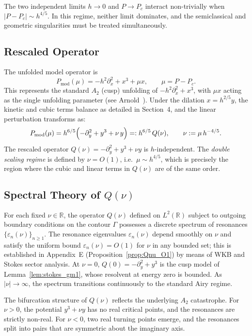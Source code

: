 \documentclass[12pt,a4paper]{amsart}
\theoremstyle{remark}
\begin{document}
The two independent limits $h \to 0$ and $P \to P_c$ interact non-trivially when
$|P - P_c| \sim h^{4/5}$. In this regime, neither limit dominates,
and the semiclassical and geometric singularities must be treated simultaneously.

\subsection{Rescaled Operator}

The unfolded model operator is
\[
  P_{\mathrm{mod}}(\mu) = -h^2\partial_x^2 + x^3 + \mu x,
  \qquad \mu = P - P_c.
\]
This represents the standard $A_2$ (cusp) unfolding of $-h^2\partial_x^2 + x^3$,
with $\mu x$ acting as the single unfolding parameter (see Arnold~\cite{Arnold72}).
Under the dilation $x = h^{2/5}y$, the kinetic and cubic terms balance as detailed in
Section~4, and the linear perturbation transforms as:
\[
  P_{\mathrm{mod}}(\mu)
  = h^{6/5}\Bigl(-\partial_y^2 + y^3 + \nu\, y\Bigr)
  =: h^{6/5}\, Q(\nu),
  \qquad
  \nu := \mu\, h^{-4/5}.
\]
The rescaled operator $Q(\nu) = -\partial_y^2 + y^3 + \nu y$ is $h$-independent.
The \emph{double scaling regime} is defined by $\nu = O(1)$, i.e.\ $\mu \sim h^{4/5}$,
which is precisely the region where the cubic and linear terms in $Q(\nu)$ are
of the same order.

\subsection{Spectral Theory of $Q(\nu)$}

For each fixed $\nu \in \mathbb{R}$, the operator $Q(\nu)$ defined on $L^2(\mathbb{R})$
subject to outgoing boundary conditions on the contour $\Gamma$ possesses a discrete
spectrum of resonances $\{\varepsilon_n(\nu)\}_{n \geq 1}$.
The resonance eigenvalues $\varepsilon_n(\nu)$ depend smoothly on $\nu$
and satisfy the uniform bound $\varepsilon_n(\nu) = O(1)$ for $\nu$ in any bounded set;
this is established in Appendix~E (Proposition~\ref{prop:Qnu_O1})
by means of WKB and Stokes sector analysis.
At $\nu = 0$, $Q(0) = -\partial_y^2 + y^3$ is the cusp model of
Lemma~\ref{lem:stokes_gm1}, whose resolvent at energy zero is bounded.
As $|\nu| \to \infty$, the spectrum transitions continuously to the
standard Airy regime.

The bifurcation structure of $Q(\nu)$ reflects the underlying $A_2$ catastrophe.
For $\nu > 0$, the potential $y^3 + \nu y$ has no real critical points, and the
resonances are strictly non-real. For $\nu < 0$, two real turning points
emerge, and the resonances split into pairs that are symmetric about the imaginary axis.
\end{document}
